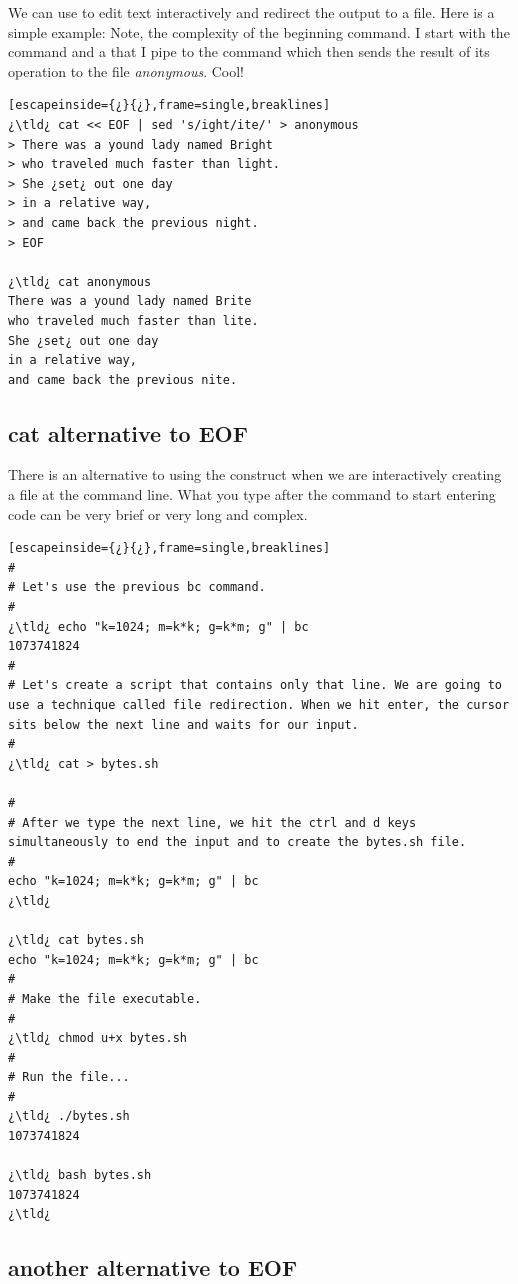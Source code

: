 We can use  to edit text interactively and redirect the output to a file. Here is a simple example: Note, the complexity of the beginning command. I start with the  command and a  that I pipe to the  command which then sends the result of its operation to the file \emph{anonymous}. Cool!

\begin{lstlisting}[escapeinside={¿}{¿},frame=single,breaklines]
¿\tld¿ cat << EOF | sed 's/ight/ite/' > anonymous
> There was a yound lady named Bright
> who traveled much faster than light.
> She ¿set¿ out one day
> in a relative way,
> and came back the previous night.
> EOF

¿\tld¿ cat anonymous
There was a yound lady named Brite
who traveled much faster than lite.
She ¿set¿ out one day
in a relative way,
and came back the previous nite.	
\end{lstlisting}

\subsection{cat alternative to EOF}

There is an alternative to using the  construct when we are interactively creating a file at the command line. What you type after the  command to start entering code can be very brief or very long and complex.

\begin{lstlisting}[escapeinside={¿}{¿},frame=single,breaklines]
#
# Let's use the previous bc command.
#
¿\tld¿ echo "k=1024; m=k*k; g=k*m; g" | bc
1073741824
#
# Let's create a script that contains only that line. We are going to use a technique called file redirection. When we hit enter, the cursor sits below the next line and waits for our input.
#
¿\tld¿ cat > bytes.sh

#
# After we type the next line, we hit the ctrl and d keys simultaneously to end the input and to create the bytes.sh file.
#
echo "k=1024; m=k*k; g=k*m; g" | bc
¿\tld¿

¿\tld¿ cat bytes.sh
echo "k=1024; m=k*k; g=k*m; g" | bc
#
# Make the file executable.
#
¿\tld¿ chmod u+x bytes.sh
#
# Run the file...
#
¿\tld¿ ./bytes.sh
1073741824

¿\tld¿ bash bytes.sh
1073741824
¿\tld¿ 
\end{lstlisting}

\subsection{another alternative to EOF}

